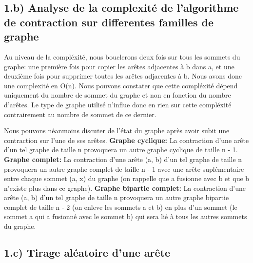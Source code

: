 \subsection{1.b) Analyse de la complexité de l'algorithme de contraction sur differentes familles de
graphe}


Au niveau de la compléxité, nous bouclerons deux fois sur tous les sommets du graphe: une première fois pour copier les arêtes adjacentes à b dans a, et une deuxième fois pour supprimer toutes les arêtes adjacentes à b. Nous avons donc une complexité en O(n). Nous pouvons constater que cette compléxité dépend uniquement du nombre de sommet du graphe et non en fonction du nombre d'arêtes. Le type de graphe utilisé n'influe donc en rien sur cette compléxité contrairement au nombre de sommet de ce dernier. \newline \newline

Nous pouvons néanmoins discuter de l'état du graphe après avoir subit une contraction sur l'une de ses arêtes. \newline
\textbf{Graphe cyclique: } \newline
La contraction d'une arête d'un tel graphe de taille n provoquera un autre graphe cyclique de taille n - 1.
\newline
\textbf{Graphe complet: } \newline
La contraction d'une arête (a, b) d'un tel graphe de taille n provoquera un autre graphe complet de taille n - 1 avec une arête suplémentaire entre chaque sommet (a, x) du graphe (on rappelle que a fusionne avec b et que b n'existe plus dans ce graphe).
\newline
\textbf{Graphe bipartie complet: } \newline
La contraction d'une arête (a, b) d'un tel graphe de taille n provoquera un autre graphe bipartie complet de taille n - 2 (on enleve les sommets a et b) en plus d'un sommet (le sommet a qui a fusionné avec le sommet b) qui sera lié à tous les autres sommets du graphe. 

\newline \newline 


\subsection{1.c) Tirage aléatoire d'une arête}

